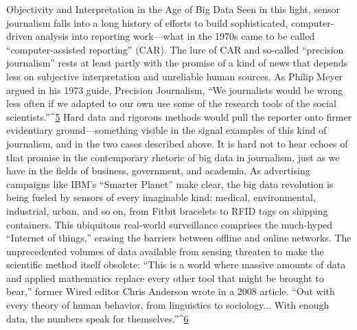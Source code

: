 Objectivity and Interpretation in the Age of Big Data
Seen in this light, sensor journalism falls into a long history of efforts to
build sophisticated, computer-driven analysis into reporting work—what in
the 1970s came to be called ``computer-assisted reporting'' (CAR). The lure
of CAR and so-called ``precision journalism'' rests at least partly with the
promise of a kind of news that depends less on subjective interpretation and
unreliable human sources. As Philip Meyer argued in his 1973 guide, Precision
Journalism, ``We journalists would be wrong less often if we adapted to
our own use some of the research tools of the social scientists.''^{\href{#endnotes-graves}{5}} Hard data
and rigorous methods would pull the reporter onto firmer evidentiary
ground—something visible in the signal examples of this kind of journalism,
and in the two cases described above.
It is hard not to hear echoes of that promise in the contemporary rhetoric of
big data in journalism, just as we have in the fields of business, government,
and academia. As advertising campaigns like IBM's ``Smarter Planet'' make
clear, the big data revolution is being fueled by sensors of every imaginable
kind: medical, environmental, industrial, urban, and so on, from Fitbit
bracelets to RFID tags on shipping containers. This ubiquitous real-world
surveillance comprises the much-hyped ``Internet of things,'' erasing the
barriers between offline and online networks. The unprecedented volumes
of data available from sensing threaten to make the scientific method itself
obsolete: ``This is a world where massive amounts of data and applied mathematics
replace every other tool that might be brought to bear,'' former
Wired editor Chris Anderson wrote in a 2008 article. ``Out with every theory
of human behavior, from linguistics to sociology... With enough data,
the numbers speak for themselves.''^{\href{#endnotes-graves}{6}}

